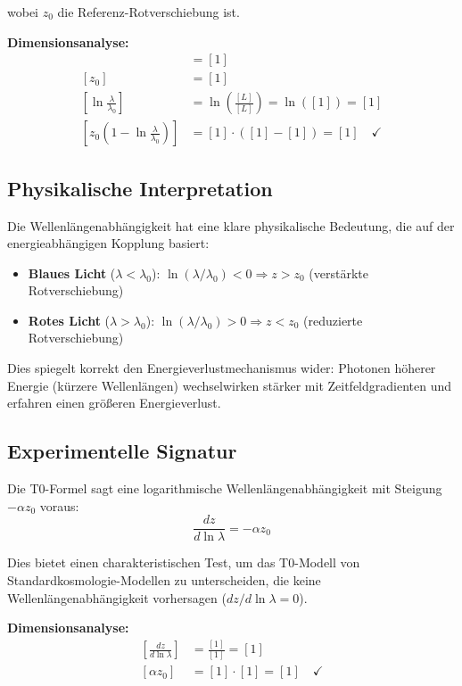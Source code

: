 \documentclass[12pt,a4paper]{report}
\begin{document}
wobei $z_0$ die Referenz-Rotverschiebung ist.

\textbf{Dimensionsanalyse:}
\begin{align}
	[z(\lambda)] &= [1] \\
	[z_0] &= [1] \\
	\left[\ln\frac{\lambda}{\lambda_0}\right] &= \ln\left(\frac{[L]}{[L]}\right) = \ln([1]) = [1] \\
	\left[z_0\left(1 - \ln\frac{\lambda}{\lambda_0}\right)\right] &= [1] \cdot ([1] - [1]) = [1] \quad \checkmark
\end{align}
	\subsection{Physikalische Interpretation}
	\label{subsec:physical_interpretation_redshift}
	
	Die Wellenlängenabhängigkeit hat eine klare physikalische Bedeutung, die auf der energieabhängigen Kopplung basiert:
	\begin{itemize}
		\item \textbf{Blaues Licht} ($\lambda < \lambda_0$): $\ln(\lambda/\lambda_0) < 0 \Rightarrow z > z_0$ (verstärkte Rotverschiebung)
		\item \textbf{Rotes Licht} ($\lambda > \lambda_0$): $\ln(\lambda/\lambda_0) > 0 \Rightarrow z < z_0$ (reduzierte Rotverschiebung)
	\end{itemize}
	
	Dies spiegelt korrekt den Energieverlustmechanismus wider: Photonen höherer Energie (kürzere Wellenlängen) wechselwirken stärker mit Zeitfeldgradienten und erfahren einen größeren Energieverlust.
	
	\subsection{Experimentelle Signatur}
	\label{subsec:experimental_signature}
	
	Die T0-Formel sagt eine logarithmische Wellenlängenabhängigkeit mit Steigung $-\alpha z_0$ voraus:
	\begin{equation}
		\frac{dz}{d\ln\lambda} = -\alpha z_0
	\end{equation}
	
	Dies bietet einen charakteristischen Test, um das T0-Modell von Standardkosmologie-Modellen zu unterscheiden, die keine Wellenlängenabhängigkeit vorhersagen ($dz/d\ln\lambda = 0$).
	
	\textbf{Dimensionsanalyse:}
	\begin{align}
		\left[\frac{dz}{d\ln\lambda}\right] &= \frac{[1]}{[1]} = [1] \\
		[\alpha z_0] &= [1] \cdot [1] = [1] \quad \checkmark
	\end{align}
	
\end{document}
